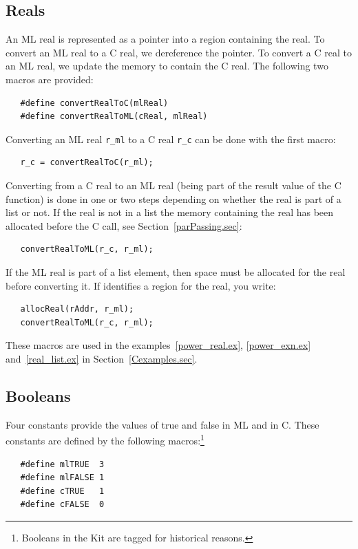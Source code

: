 \documentclass[12pt]{book}
\begin{document}
\subsection{Reals}
An ML real is represented as a pointer into a region containing the
real. To convert an ML real to a C real, we dereference the pointer. To
convert a C real to an ML real, we update the memory to contain the C
real. The following two macros are provided:
%
%
\begin{verbatim}
   #define convertRealToC(mlReal)
   #define convertRealToML(cReal, mlReal)
\end{verbatim}

Converting an ML real \verb|r_ml| to a C real \verb|r_c| can be done with the first macro:
\begin{verbatim}
   r_c = convertRealToC(r_ml);
\end{verbatim}

Converting from a C real to an ML real (being part of the result value of the
C function) is done in one or two steps depending on whether the real is
part of a list or not. If the real is not in a list the memory containing
the real has been allocated before the C call, see Section~\ref{parPassing.sec}:
\begin{verbatim}
   convertRealToML(r_c, r_ml);
\end{verbatim}
If the ML real is part of a list element, then space must be allocated for
the real before converting it. If  identifies a region
for the real, you write:
%
\begin{verbatim}
   allocReal(rAddr, r_ml);
   convertRealToML(r_c, r_ml);
\end{verbatim}

These macros are used in the examples~\ref{power_real.ex},
\ref{power_exn.ex} and~\ref{real_list.ex} in
Section~\ref{Cexamples.sec}.

\subsection{Booleans}
Four constants provide the values of true and false in ML and in
C. These constants are defined by the following macros:\footnote{Booleans in the
Kit are tagged for historical reasons.}
%
%
%
%
\begin{verbatim}
   #define mlTRUE  3
   #define mlFALSE 1
   #define cTRUE   1
   #define cFALSE  0
\end{verbatim}
\end{document}

